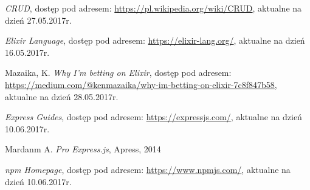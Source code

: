\documentclass[mgr,oneside]{mgr}
\begin{document}
\begin{thebibliography}{inteligencja}
  \emph{CRUD}, dostęp pod adresem: \url{https://pl.wikipedia.org/wiki/CRUD}, aktualne na dzień 27.05.2017r.

  \emph{Elixir Language}, dostęp pod adresem: \url{https://elixir-lang.org/}, aktualne na dzień 16.05.2017r.

  Mazaika, K. \emph{Why I'm betting on Elixir}, dostęp pod adresem: \url{https://medium.com/@kenmazaika/why-im-betting-on-elixir-7c8f847b58}, aktualne na dzień 28.05.2017r.

  \emph{Express Guides}, dostęp pod adresem: \url{https://expressjs.com/}, aktualne na dzień 10.06.2017r.

  Mardanm A. \emph{Pro Express.js}, Apress, 2014

  \emph{npm Homepage}, dostęp pod adresem: \url{https://www.npmjs.com/}, aktualne na dzień 10.06.2017r.

\end{thebibliography}
\end{document}
